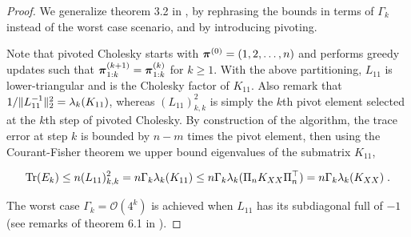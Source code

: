 \documentclass{article}
\begin{document}
\begin{proof}
We generalize theorem 3.2 in \cite{harbrecht_low-rank_2012}, by rephrasing the bounds in terms of $\Gamma_k$ instead of the worst case scenario, and by introducing pivoting.

Note that pivoted Cholesky starts with $\boldsymbol{\mathbf{\pi}}^{(0)} = (1, 2, \ldots, n)$ and performs greedy updates such that $\boldsymbol{\mathbf{\pi}}^{(k+1)}_{1:k} = \boldsymbol{\mathbf{\pi}}^{(k)}_{1:k}$ for $k\ge 1$. With the above partitioning, $L_{11}$ is lower-triangular and is the Cholesky factor of $K_{11}$. Also remark that $1/\Vert L_{11}^{-1} \Vert_2^2 = \lambda_k(K_{11})$, whereas $(L_{11})_{k, k}^2$ is simply the $k$th pivot element selected at the $k$th step of pivoted Cholesky.
By construction of the algorithm, the trace error at step $k$ is bounded by $n-m$ times the pivot element, then using the Courant-Fisher theorem we upper bound eigenvalues of the submatrix $K_{11}$,

\begin{equation*}
    \operatorname{Tr}(E_k) \le n (L_{11})_{k, k}^2 = n \Gamma_k \lambda_k(K_{11}) \le n \Gamma_k \lambda_k(\Pi_n K_{XX} \Pi_n^\top) = n \Gamma_k \lambda_k(K_{XX}) \; .
\end{equation*}

The worst case $\Gamma_k = \mathcal O(4^k)$ is achieved when $L_{11}$ has its subdiagonal full of $-1$ (see remarks of theorem 6.1 in \cite{higham_survey_1987}).
\end{proof}
\end{document}
